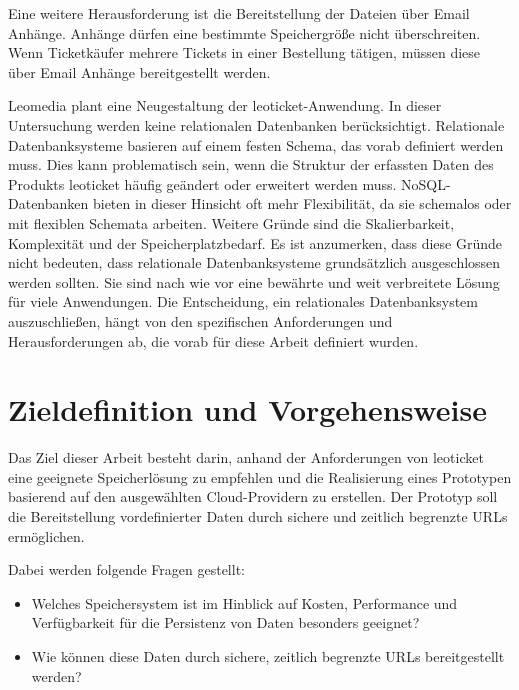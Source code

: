 Eine weitere Herausforderung ist die Bereitstellung der Dateien über Email Anhänge. Anhänge dürfen eine bestimmte Speichergröße nicht überschreiten. Wenn Ticketkäufer mehrere Tickets in einer Bestellung tätigen, müssen diese über Email Anhänge bereitgestellt werden.\\

\newpage

Leomedia plant eine Neugestaltung der leoticket-Anwendung. In dieser Untersuchung werden keine relationalen Datenbanken berücksichtigt. Relationale Datenbanksysteme basieren auf einem festen Schema, das vorab definiert werden muss. Dies kann problematisch sein, wenn die Struktur der erfassten Daten des Produkts leoticket häufig geändert oder erweitert werden muss. NoSQL-Datenbanken bieten in dieser Hinsicht oft mehr Flexibilität, da sie schemalos oder mit flexiblen Schemata arbeiten. Weitere Gründe sind die Skalierbarkeit, Komplexität und der Speicherplatzbedarf. Es ist anzumerken, dass diese Gründe nicht bedeuten, dass relationale Datenbanksysteme grundsätzlich ausgeschlossen werden sollten. Sie sind nach wie vor eine bewährte und weit verbreitete Lösung für viele Anwendungen. Die Entscheidung, ein relationales Datenbanksystem auszuschließen, hängt von den spezifischen Anforderungen und Herausforderungen ab, die vorab für diese Arbeit definiert wurden.

\newpage

\section{Zieldefinition und Vorgehensweise}

Das Ziel dieser Arbeit besteht darin, anhand der Anforderungen von leoticket eine geeignete Speicherlösung zu empfehlen und die Realisierung eines Prototypen basierend auf den ausgewählten Cloud-Providern zu erstellen. Der Prototyp soll die Bereitstellung vordefinierter Daten durch sichere und zeitlich begrenzte URLs ermöglichen. 

Dabei werden folgende Fragen gestellt:

\begin{itemize}
	\item Welches Speichersystem ist im Hinblick auf Kosten, Performance und Verfügbarkeit für die Persistenz von Daten besonders geeignet? 
	\item Wie können diese Daten durch sichere, zeitlich begrenzte URLs bereitgestellt werden?
\end{itemize}

